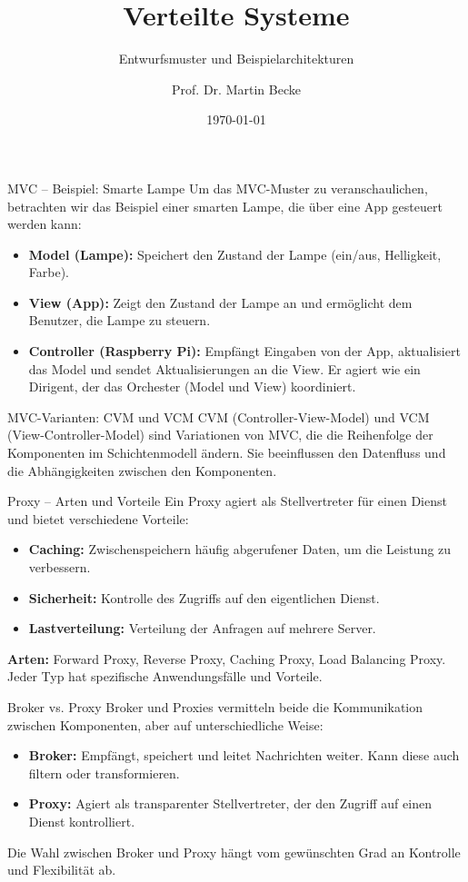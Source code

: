 \documentclass{beamer}
\title{Verteilte Systeme}
\subtitle{Entwurfsmuster und Beispielarchitekturen}
\author{Prof. Dr. Martin Becke}
\date{\today}
\begin{document}
\begin{frame}
    \titlepage
\end{frame}

\begin{frame}{MVC – Beispiel: Smarte Lampe}
    Um das MVC-Muster zu veranschaulichen, betrachten wir das Beispiel einer smarten Lampe, die über eine App gesteuert werden kann:
    \begin{itemize}
        \item \textbf{Model (Lampe):} Speichert den Zustand der Lampe (ein/aus, Helligkeit, Farbe).
        \item \textbf{View (App):} Zeigt den Zustand der Lampe an und ermöglicht dem Benutzer, die Lampe zu steuern.
        \item \textbf{Controller (Raspberry Pi):} Empfängt Eingaben von der App, aktualisiert das Model und sendet Aktualisierungen an die View. Er agiert wie ein Dirigent, der das Orchester (Model und View) koordiniert.
    \end{itemize}
\end{frame}

\begin{frame}{MVC-Varianten: CVM und VCM}
    CVM (Controller-View-Model) und VCM (View-Controller-Model) sind Variationen von MVC, die die Reihenfolge der Komponenten im Schichtenmodell ändern. Sie beeinflussen den Datenfluss und die Abhängigkeiten zwischen den Komponenten.
\end{frame}

\begin{frame}{Proxy – Arten und Vorteile}
    Ein Proxy agiert als Stellvertreter für einen Dienst und bietet verschiedene Vorteile:
    \begin{itemize}
        \item \textbf{Caching:} Zwischenspeichern häufig abgerufener Daten, um die Leistung zu verbessern.
        \item \textbf{Sicherheit:} Kontrolle des Zugriffs auf den eigentlichen Dienst.
        \item \textbf{Lastverteilung:} Verteilung der Anfragen auf mehrere Server.
    \end{itemize}

    \textbf{Arten:} Forward Proxy, Reverse Proxy, Caching Proxy, Load Balancing Proxy. Jeder Typ hat spezifische Anwendungsfälle und Vorteile.
\end{frame}

\begin{frame}{Broker vs. Proxy}
    Broker und Proxies vermitteln beide die Kommunikation zwischen Komponenten, aber auf unterschiedliche Weise:
    \begin{itemize}
        \item \textbf{Broker:} Empfängt, speichert und leitet Nachrichten weiter. Kann diese auch filtern oder transformieren.
        \item \textbf{Proxy:} Agiert als transparenter Stellvertreter, der den Zugriff auf einen Dienst kontrolliert.
    \end{itemize}
    Die Wahl zwischen Broker und Proxy hängt vom gewünschten Grad an Kontrolle und Flexibilität ab.
\end{frame}
\end{document}
